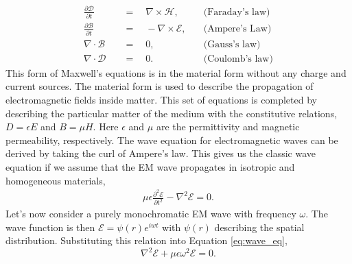 \documentclass[letterpaper]{ar-1col}
\begin{document}
\begin{equation}
\begin{aligned}
\frac{\partial\mathcal{D}}{\partial t} \quad & = \quad \nabla\times\mathcal{H},   & \quad \text{(Faraday's law)} \\[5pt]
\frac{\partial\mathcal{B}}{\partial t} \quad & = \quad -\nabla\times\mathcal{E},  & \quad \text{(Ampere's Law)}   \\[5pt]
\nabla\cdot\mathcal{B}                 \quad & = \quad 0,                         & \quad \text{(Gauss's law)}   \\[5pt]
\nabla\cdot\mathcal{D}                 \quad & = \quad 0.                         & \quad \text{(Coulomb's law)}
\end{aligned}
\end{equation}
This form of Maxwell's equations is in the material form without any charge and current sources. The material form is used to describe the propagation of electromagnetic fields inside matter. This set of equations is completed by describing the particular matter of the medium with the constitutive relations, $D=\epsilon E$ and $B=\mu H$. Here $\epsilon$ and $\mu$ are the permittivity and magnetic permeability, respectively. The wave equation for electromagnetic waves can be derived by taking the curl of Ampere's law. This gives us the classic wave equation if we assume that the EM wave propagates in isotropic and homogeneous materials,
\begin{equation}
\label{eq:wave_eq}
\begin{aligned}
\mu \epsilon \frac{\partial^2 \mathcal{E}}{\partial t^2} - \nabla^2\mathcal{E} = 0 .
\end{aligned}
\end{equation}
Let's now consider a purely monochromatic EM wave with frequency $\omega$. The wave function is then $\mathcal{E}=\psi(r) e^{iwt}$ with $\psi(r)$ describing the spatial distribution. Substituting this relation into Equation \ref{eq:wave_eq},
\begin{equation}
\nabla^2\mathcal{E} +\mu \epsilon \omega^2 \mathcal{E} = 0.
\end{equation}
\end{document}
